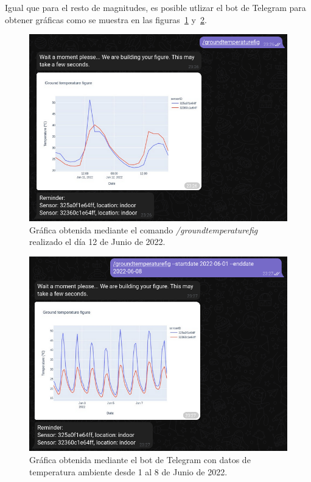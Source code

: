 \documentclass[a4paper, 12pt, oneside]{book}
\begin{document}
Igual que para el resto de magnitudes, es posible utlizar el bot de Telegram para obtener gráficas como se muestra en las figuras~\ref{figura:groundtemperaturefig_telegram} y~\ref{figura:groundtemperaturefig_telegram_options}.

\begin{figure}[H]
	\centering
    \includegraphics[width=12cm, keepaspectratio]{img/groundtemperaturefig_telegram}
    \caption{Gráfica obtenida mediante el comando \textit{/groundtemperaturefig} realizado el día 12 de Junio de 2022.}
    \label{figura:groundtemperaturefig_telegram}
\end{figure}

\begin{figure}[H]
	\centering
    \includegraphics[width=12cm, keepaspectratio]{img/groundtemperaturefig_telegram_options}
    \caption{Gráfica obtenida mediante el bot de Telegram con datos de temperatura ambiente desde 1 al 8 de Junio de 2022.}
    \label{figura:groundtemperaturefig_telegram_options}
\end{figure}
\end{document}
